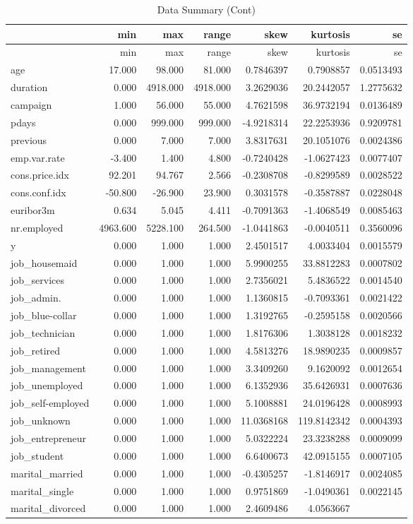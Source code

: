 \documentclass[english,man]{apa6}
\begin{document}
\begin{longtable}[c]{@{}lrrrrrr@{}}
\caption{Data Summary (Cont)}\tabularnewline
\toprule
& min & max & range & skew & kurtosis & se\tabularnewline
\midrule
\endfirsthead
\toprule
& min & max & range & skew & kurtosis & se\tabularnewline
\midrule
\endhead
age & 17.000 & 98.000 & 81.000 & 0.7846397 & 0.7908857 &
0.0513493\tabularnewline
duration & 0.000 & 4918.000 & 4918.000 & 3.2629036 & 20.2442057 &
1.2775632\tabularnewline
campaign & 1.000 & 56.000 & 55.000 & 4.7621598 & 36.9732194 &
0.0136489\tabularnewline
pdays & 0.000 & 999.000 & 999.000 & -4.9218314 & 22.2253936 &
0.9209781\tabularnewline
previous & 0.000 & 7.000 & 7.000 & 3.8317631 & 20.1051076 &
0.0024386\tabularnewline
emp.var.rate & -3.400 & 1.400 & 4.800 & -0.7240428 & -1.0627423 &
0.0077407\tabularnewline
cons.price.idx & 92.201 & 94.767 & 2.566 & -0.2308708 & -0.8299589 &
0.0028522\tabularnewline
cons.conf.idx & -50.800 & -26.900 & 23.900 & 0.3031578 & -0.3587887 &
0.0228048\tabularnewline
euribor3m & 0.634 & 5.045 & 4.411 & -0.7091363 & -1.4068549 &
0.0085463\tabularnewline
nr.employed & 4963.600 & 5228.100 & 264.500 & -1.0441863 & -0.0040511 &
0.3560096\tabularnewline
y & 0.000 & 1.000 & 1.000 & 2.4501517 & 4.0033404 &
0.0015579\tabularnewline
job\_housemaid & 0.000 & 1.000 & 1.000 & 5.9900255 & 33.8812283 &
0.0007802\tabularnewline
job\_services & 0.000 & 1.000 & 1.000 & 2.7356021 & 5.4836522 &
0.0014540\tabularnewline
job\_admin. & 0.000 & 1.000 & 1.000 & 1.1360815 & -0.7093361 &
0.0021422\tabularnewline
job\_blue-collar & 0.000 & 1.000 & 1.000 & 1.3192765 & -0.2595158 &
0.0020566\tabularnewline
job\_technician & 0.000 & 1.000 & 1.000 & 1.8176306 & 1.3038128 &
0.0018232\tabularnewline
job\_retired & 0.000 & 1.000 & 1.000 & 4.5813276 & 18.9890235 &
0.0009857\tabularnewline
job\_management & 0.000 & 1.000 & 1.000 & 3.3409260 & 9.1620092 &
0.0012654\tabularnewline
job\_unemployed & 0.000 & 1.000 & 1.000 & 6.1352936 & 35.6426931 &
0.0007636\tabularnewline
job\_self-employed & 0.000 & 1.000 & 1.000 & 5.1008881 & 24.0196428 &
0.0008993\tabularnewline
job\_unknown & 0.000 & 1.000 & 1.000 & 11.0368168 & 119.8142342 &
0.0004393\tabularnewline
job\_entrepreneur & 0.000 & 1.000 & 1.000 & 5.0322224 & 23.3238288 &
0.0009099\tabularnewline
job\_student & 0.000 & 1.000 & 1.000 & 6.6400673 & 42.0915155 &
0.0007105\tabularnewline
marital\_married & 0.000 & 1.000 & 1.000 & -0.4305257 & -1.8146917 &
0.0024085\tabularnewline
marital\_single & 0.000 & 1.000 & 1.000 & 0.9751869 & -1.0490361 &
0.0022145\tabularnewline
marital\_divorced & 0.000 & 1.000 & 1.000 & 2.4609486 & 4.0563667 &

\end{longtable}
\end{document}
